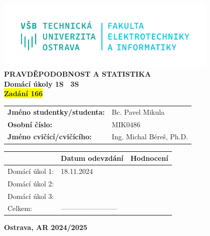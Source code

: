 \documentclass[a4paper,12pt]{report}
\newcommand{\sourceId}   {166}
\newcommand{\studentName}{Bc. Pavel Mikula}
\newcommand{\studentID}  {MIK0486}
\newcommand{\teacherName}{Ing. Michal Béreš, Ph.D.}
\begin{document}
\thispagestyle{empty}
\setcounter{page}{0}

\begin{center}
    \includegraphics[width=0.8\textwidth]{assets/logo.png} \\[4em]
    \vspace{4em}
    \textbf{PRAVDĚPODOBNOST A STATISTIKA} \\
    \vspace{1em}
    \textbf{Domácí úkoly 1S \textendash\ 3S} \\
    \textbf{\colorbox{yellow}{Zadání \sourceId}} \\
\end{center}

\vspace{2em}
\hspace{3em}
\begin{tabular}{ll}
    \textbf{Jméno studentky/studenta:}  & \hspace{6em} \studentName \\[0.5em]
    \textbf{Osobní číslo:}              & \hspace{6em} \studentID   \\[0.5em]
    \textbf{Jméno cvičící/cvičícího:}   & \hspace{6em} \teacherName \\
\end{tabular}

\vspace{10em}
\begin{center}
    \renewcommand{\arraystretch}{1.3}
    \begin{tabular}{|p{8em}|P{10em}|P{10em}|}
        \hline
                        & \textbf{Datum odevzdání}  & \textbf{Hodnocení}    \\ \hline
        Domácí úkol 1:  & 18.11.2024                &                       \\ \hline
        Domácí úkol 2:  &                           &                       \\ \hline
        Domácí úkol 3:  &                           &                       \\ \hline
        Celkem:         & ------------------------  &                       \\ \hline
    \end{tabular}
\end{center}

\vspace{5em}
\begin{center}
    \textbf{Ostrava, AR 2024/2025}
\end{center}

%

\newpage


%

%

%
\end{document}
